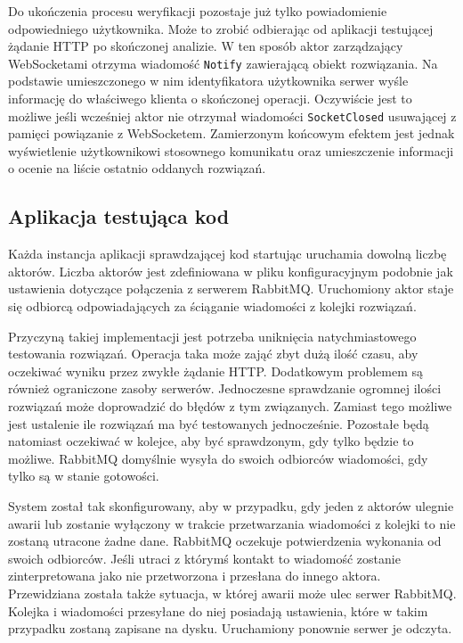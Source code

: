 \documentclass[brudnopis]{xmgr}
\begin{document}
Do ukończenia procesu weryfikacji pozostaje już tylko powiadomienie odpowiedniego użytkownika. Może to zrobić odbierając od aplikacji testującej żądanie HTTP po skończonej analizie. W ten sposób aktor zarządzający WebSocketami otrzyma wiadomość \texttt{Notify} zawierającą obiekt rozwiązania. Na podstawie umieszczonego w nim identyfikatora użytkownika serwer wyśle informację do właściwego klienta o skończonej operacji. Oczywiście jest to możliwe jeśli wcześniej aktor nie otrzymał wiadomości \texttt{SocketClosed} usuwającej z pamięci powiązanie z WebSocketem. Zamierzonym końcowym efektem jest jednak wyświetlenie użytkownikowi stosownego komunikatu oraz umieszczenie informacji o ocenie na liście ostatnio oddanych rozwiązań. 

\subsection{Aplikacja testująca kod}
 
Każda instancja aplikacji sprawdzającej kod startując uruchamia dowolną liczbę aktorów. Liczba aktorów jest zdefiniowana w pliku konfiguracyjnym podobnie jak ustawienia dotyczące połączenia z serwerem RabbitMQ. Uruchomiony aktor staje się odbiorcą odpowiadających za ściąganie wiadomości z kolejki rozwiązań. 

Przyczyną takiej implementacji jest potrzeba uniknięcia natychmiastowego testowania rozwiązań. Operacja taka może zająć zbyt dużą ilość czasu, aby oczekiwać wyniku przez zwykłe żądanie HTTP. Dodatkowym problemem są również ograniczone zasoby serwerów. Jednoczesne sprawdzanie ogromnej ilości rozwiązań może doprowadzić do błędów z tym związanych. Zamiast tego możliwe jest ustalenie ile rozwiązań ma być testowanych jednocześnie. Pozostałe będą natomiast oczekiwać w kolejce, aby być sprawdzonym, gdy tylko będzie to możliwe. RabbitMQ domyślnie wysyła do swoich odbiorców wiadomości, gdy tylko są w stanie gotowości.

System został tak skonfigurowany, aby w przypadku, gdy jeden z aktorów ulegnie awarii lub zostanie wyłączony w trakcie przetwarzania wiadomości z kolejki to nie zostaną utracone żadne dane. RabbitMQ oczekuje potwierdzenia wykonania od swoich odbiorców. Jeśli utraci z którymś kontakt to wiadomość zostanie zinterpretowana jako nie przetworzona i przesłana do innego aktora. Przewidziana została także sytuacja, w której awarii może ulec serwer RabbitMQ. Kolejka i wiadomości przesyłane do niej posiadają ustawienia, które w takim przypadku zostaną zapisane na dysku. Uruchamiony ponownie serwer je odczyta. 
\end{document}
